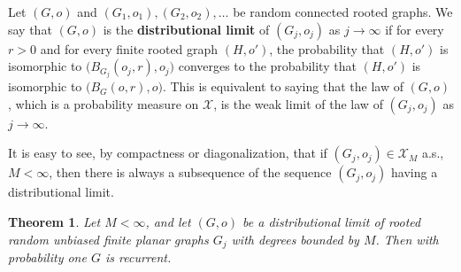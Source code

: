 \documentclass[12pt,naturalnames]{article}
\numberwithin{equation}{section}
\numberwithin{figure}{section}
\newtheorem{theorem}{Theorem}
\numberwithin{theorem}{section}
\begin{document}
Let $(G,o)$ and $(G_1,o_1),(G_2,o_2),\dots$
be random connected rooted graphs.
We say that $(G,o)$ is the {\bf distributional limit} of $(G_j,o_j)$
as $j\to\infty$ if for every $r>0$ and for every finite rooted graph $(H,o')$,
the probability that $(H,o')$ is isomorphic to
$\bigl(B_{G_j}(o_j,r),o_j\bigr)$
converges to the probability that
$(H,o')$ is isomorphic to $\bigl(B_{G}(o,r),o\bigr)$.
This is equivalent to saying that the law of $(G,o)$,
which is a probability measure on $\mathcal X$, is the weak limit
of the law of $(G_j,o_j)$ as $j\to\infty$.

It is easy to see, by compactness or diagonalization, 
that if $(G_j,o_j)\in\mathcal X_M$ a.s., $M<\infty$, then
there is always a subsequence of the sequence $(G_j,o_j)$
having a distributional limit.


\begin{theorem}\label{para}
Let $M<\infty$, and
let $(G,o)$ be a distributional limit
of rooted random unbiased finite planar graphs $G_j$
with degrees bounded by $M$.
Then with probability one $G$ is recurrent.
\end{theorem}
\end{document}

